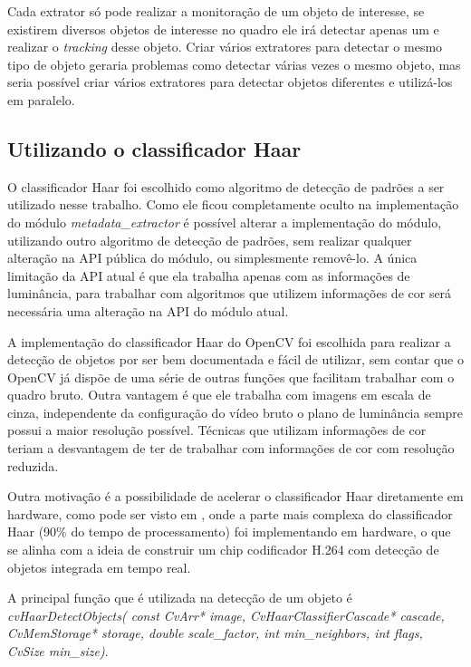 Cada extrator só pode realizar a monitoração de um objeto de interesse, se existirem diversos objetos de interesse no quadro ele irá detectar apenas um e realizar o \textit{tracking} desse objeto. Criar vários extratores para detectar o mesmo tipo de objeto geraria problemas como detectar várias vezes o mesmo objeto, mas seria possível criar vários extratores para detectar objetos diferentes e utilizá-los em paralelo.


\subsection{ Utilizando o classificador Haar }


O classificador Haar foi escolhido como algoritmo de detecção de padrões a ser utilizado nesse trabalho. Como ele ficou completamente oculto na implementação do módulo \textit{metadata\_extractor} é possível alterar a implementação do módulo, utilizando outro algoritmo de detecção de padrões, sem realizar qualquer alteração na API pública do módulo, ou simplesmente removê-lo. A única limitação da API atual é que ela trabalha apenas com as informações de luminância, para trabalhar com algoritmos que utilizem informações de cor será necessária uma alteração na API do módulo atual.

A implementação do classificador Haar do OpenCV foi escolhida para realizar a detecção de objetos por ser bem documentada e fácil de utilizar, sem contar que o OpenCV já dispõe de uma série de outras funções que facilitam trabalhar com o quadro bruto. Outra vantagem é que ele trabalha com imagens em escala de cinza, independente da configuração do vídeo bruto o plano de luminância sempre possui a maior resolução possível. Técnicas que utilizam informações de cor teriam a desvantagem de ter de trabalhar com informações de cor com resolução reduzida. 

Outra motivação é a possibilidade de acelerar o classificador Haar diretamente em hardware, como pode ser visto em  \cite{haarFPGA}, onde a parte mais complexa do classificador Haar (90\% do tempo de processamento) foi implementando em hardware, o que se alinha com a ideia de construir um chip codificador H.264 com detecção de objetos integrada em tempo real. 

A principal função que é utilizada na detecção de um objeto é \textit{cvHaarDetectObjects( const CvArr* image, CvHaarClassifierCascade* cascade, CvMemStorage* storage, double scale\_factor, int min\_neighbors, int flags, CvSize min\_size)}.

